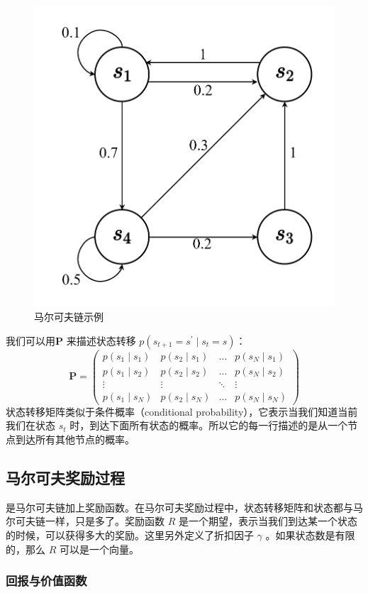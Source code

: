 \begin{figure}[htb]
  \centering
  \includegraphics[width=0.3\linewidth]{ch2/figs/m_chain_example.png}
  \caption{马尔可夫链示例}
  \label{fig:mp_example}
\end{figure}

我们可以用$\boldsymbol{P}$ 来描述状态转移 $p\left(s_{t+1}=s^{\prime} \mid s_{t}=s\right)$：
\begin{equation}
  \boldsymbol{P}=\left(\begin{array}{cccc}
    p\left(s_{1} \mid s_{1}\right) & p\left(s_{2} \mid s_{1}\right) & \ldots & p\left(s_{N} \mid s_{1}\right) \\
    p\left(s_{1} \mid s_{2}\right) & p\left(s_{2} \mid s_{2}\right) & \ldots & p\left(s_{N} \mid s_{2}\right) \\
    \vdots & \vdots & \ddots & \vdots \\
    p\left(s_{1} \mid s_{N}\right) & p\left(s_{2} \mid s_{N}\right) & \ldots & p\left(s_{N} \mid s_{N}\right)
    \end{array}\right)
  \label{eq:1}
\end{equation}
状态转移矩阵类似于条件概率（conditional probability），它表示当我们知道当前我们在状态 $s_t$ 时，到达下面所有状态的概率。所以它的每一行描述的是从一个节点到达所有其他节点的概率。

\subsection{马尔可夫奖励过程} 

是马尔可夫链加上奖励函数。在马尔可夫奖励过程中，状态转移矩阵和状态都与马尔可夫链一样，只是多了。奖励函数 $R$ 是一个期望，表示当我们到达某一个状态的时候，可以获得多大的奖励。这里另外定义了折扣因子 $\gamma$ 。如果状态数是有限的，那么 $R$ 可以是一个向量。

\subsubsection{回报与价值函数}

